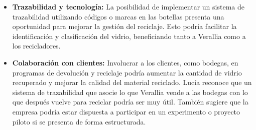 \begin{itemize}
		\item \textbf{Trazabilidad y tecnología:} La posibilidad de implementar un sistema de trazabilidad utilizando códigos o marcas en las botellas presenta una oportunidad para mejorar la gestión del reciclaje. Esto podría facilitar la identificación y clasificación del vidrio, beneficiando tanto a Verallia como a los recicladores.
		
		\item \textbf{Colaboración con clientes:} Involucrar a los clientes, como bodegas, en programas de devolución y reciclaje podría aumentar la cantidad de vidrio recuperado y mejorar la calidad del material reciclado. Lucía reconoce que un sistema de trazabilidad que asocie lo que Verallia vende a las bodegas con lo que después vuelve para reciclar podría ser muy útil. También sugiere que la empresa podría estar dispuesta a participar en un experimento o proyecto piloto si se presenta de forma estructurada.
\end{itemize}
